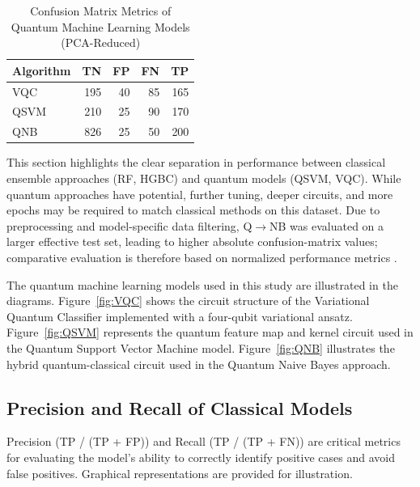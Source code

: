 \documentclass[runningheads]{llncs}
\begin{document}
\begin{table}[ht]
\centering
\caption{Confusion Matrix Metrics of Quantum Machine Learning Models (PCA-Reduced)}
\label{tab:qml_metrics}
\begin{tabular}{lrrrr}
\toprule
\textbf{Algorithm} & \textbf{TN} & \textbf{FP} & \textbf{FN} & \textbf{TP} \\
\midrule
VQC  & 195 & 40 & 85 & 165 \\
QSVM & 210 & 25 & 90 & 170 \\
QNB  & 826 & 25 & 50 & 200 \\
\bottomrule
\end{tabular}
\end{table}

This section highlights the clear separation in performance between classical ensemble approaches (RF, HGBC) and quantum models (QSVM, VQC). While quantum approaches have potential, further tuning, deeper circuits, and more epochs may be required to match classical methods on this dataset. Due to preprocessing and model-specific data filtering, Q$\rightarrow$NB was evaluated on a larger effective test set, leading to higher absolute confusion-matrix values; comparative evaluation is therefore based on normalized performance metrics \cite{bishop2006}.

The quantum machine learning models used in this study are illustrated in the diagrams. Figure~\ref{fig:VQC} shows the circuit structure of the Variational Quantum Classifier implemented with a four-qubit variational ansatz. Figure~\ref{fig:QSVM} represents the quantum feature map and kernel circuit used in the Quantum Support Vector Machine model. Figure~\ref{fig:QNB} illustrates the hybrid quantum-classical circuit used in the Quantum Naive Bayes approach.

\subsection{Precision and Recall of Classical Models}\label{sec:precision_recall}


Precision (TP / (TP + FP)) and Recall (TP / (TP + FN)) are critical metrics for evaluating the model's ability to correctly identify positive cases and avoid false positives. Graphical representations are provided for illustration.
\end{document}
